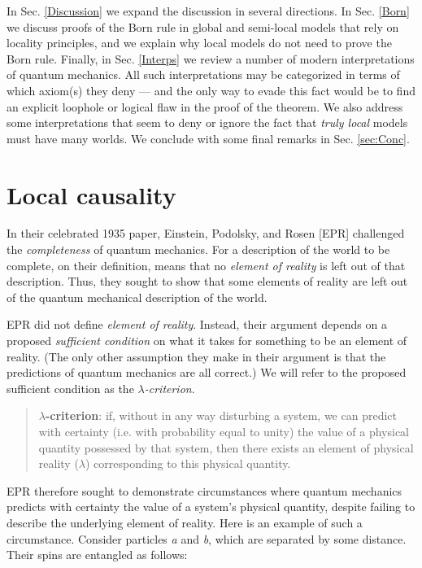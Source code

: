 \documentclass[12pt]{article}
\begin{document}
In Sec. \ref{Discussion} we expand the discussion in several directions. In Sec. \ref{Born} we discuss proofs of the Born rule in global and semi-local models that rely on locality principles, and we explain why local models do not need to prove the Born rule. Finally, in Sec. \ref{Interps} we review a number of modern interpretations of quantum mechanics. All such interpretations may be categorized in terms of which axiom(s) they deny --- and the only way to evade this fact would be to find an explicit loophole or logical flaw in the proof of the theorem. We also address some interpretations that seem to deny or ignore the fact that \textit{truly local} models must have many worlds. We conclude with some final remarks in Sec. \ref{sec:Conc}.



\section{Local causality} \label{Locality}

In their celebrated 1935 paper, Einstein, Podolsky, and Rosen [EPR] challenged the \textit{completeness} of quantum mechanics. For a description of the world to be complete, on their definition, means that no \textit{element of reality} is left out of that description. Thus, they sought to show that some elements of reality are left out of the quantum mechanical description of the world.

EPR did not define \textit{element of reality}. Instead, their argument depends on a proposed \textit{sufficient condition} on what it takes for something to be an element of reality. (The only other assumption they make in their argument is that the predictions of quantum mechanics are all correct.) We will refer to the proposed sufficient condition as the \textit{$\lambda$-criterion}. 

\begin{quote}
\textbf{$\lambda$-criterion}: if, without in any way disturbing a system, we can predict with certainty (i.e. with probability equal to unity) the value of a physical quantity possessed by that system, then there exists an element of physical reality ($\lambda$) corresponding to this physical quantity.
\end{quote}

EPR therefore sought to demonstrate circumstances where quantum mechanics predicts with certainty the value of a system's physical quantity, despite failing to describe the underlying element of reality. Here is an example of such a circumstance. Consider particles \textit{a} and \textit{b}, which are separated by some distance. Their spins are entangled as follows:
\end{document}
